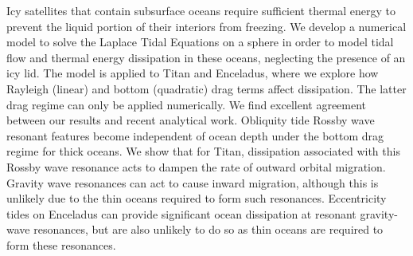 Icy satellites that contain subsurface oceans require sufficient thermal energy to prevent the liquid portion of their interiors from freezing. We develop a numerical model to solve the Laplace Tidal Equations on a sphere in order to model tidal flow and thermal energy dissipation in these oceans, neglecting the presence of an icy lid. The model is applied to Titan and Enceladus, where we explore how Rayleigh (linear) and bottom (quadratic) drag terms affect dissipation. The latter drag regime can only be applied numerically. We find excellent agreement between our results and recent analytical work. Obliquity tide Rossby wave resonant features become independent of ocean depth under the bottom drag regime for thick oceans. We show that for Titan, dissipation associated with this Rossby wave resonance acts to dampen the rate of outward orbital migration. Gravity wave resonances can act to cause inward migration, although this is unlikely due to the thin oceans required to form such resonances. Eccentricity tides on Enceladus can provide significant ocean dissipation at resonant gravity-wave resonances, but are also unlikely to do so as thin oceans are required to form these resonances.